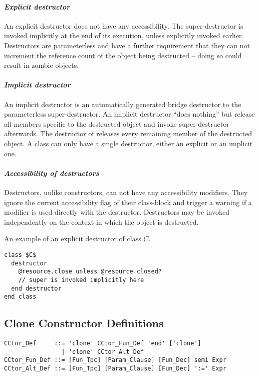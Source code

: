 \paragraph{\em Explicit destructor}
An explicit destructor does not have any accessibility. The super-destructor is invoked implicitly at the end of its execution, unless explicitly invoked earlier. Destructors are parameterless and have a further requirement that they can not increment the reference count of the object being destructed -- doing so could result in zombie objects. 

\paragraph{\em Implicit destructor}
An implicit destructor is an automatically generated bridge destructor to the parameterless super-destructor. An implicit destructor ``does nothing'' but release all members specific to the destructed object and invoke super-destructor afterwards. The destructor of  releases every remaining member of the destructed object. A class can only have a single destructor, either an explicit or an implicit one. 

\paragraph{\em Accessibility of destructors}
Destructors, unlike constructors, can not have any accessibility modifiers. They ignore the current accessibility flag of their class-block and trigger a warning if a modifier is used directly with the destructor. Destructors may be invoked independently on the context in which the object is destructed. 

\example An example of an explicit destructor of class $C$. 
\begin{lstlisting}
class $C$
  destructor
    @resource.close unless @resource.closed?
    // super is invoked implicitly here
  end destructor
end class
\end{lstlisting}

\subsection{Clone Constructor Definitions}
\label{sec:clone-def}

\syntax\begin{lstlisting}
CCtor_Def     ::= 'clone' CCtor_Fun_Def 'end' ['clone']
                | 'clone' CCtor_Alt_Def
CCtor_Fun_Def ::= [Fun_Tpc] [Param_Clause] [Fun_Dec] semi Expr
CCtor_Alt_Def ::= [Fun_Tpc] [Param_Clause] [Fun_Dec] ':=' Expr
\end{lstlisting}


